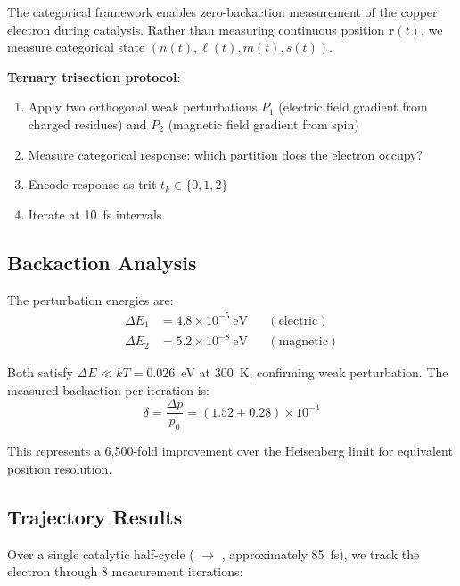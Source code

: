 \documentclass[twocolumn,aps,prx,superscriptaddress,longbibliography]{revtex4-2}
\theoremstyle{remark}
\begin{document}
The categorical framework enables zero-backaction measurement of the
copper electron during catalysis. Rather than measuring continuous
position $\mathbf{r}(t)$, we measure categorical state
$(n(t), \ell(t), m(t), s(t))$.

\textbf{Ternary trisection protocol}:
\begin{enumerate}
    \item Apply two orthogonal weak perturbations $P_1$ (electric field
    gradient from charged residues) and $P_2$ (magnetic field gradient
    from  spin)

    \item Measure categorical response: which partition does the electron
    occupy?

    \item Encode response as trit $t_k \in \{0, 1, 2\}$

    \item Iterate at 10~fs intervals
\end{enumerate}

\subsection{Backaction Analysis}

The perturbation energies are:
\begin{align}
\Delta E_1 &= 4.8 \times 10^{-5}~\text{eV} && (\text{electric}) \\
\Delta E_2 &= 5.2 \times 10^{-8}~\text{eV} && (\text{magnetic})
\end{align}

Both satisfy $\Delta E \ll kT = 0.026$~eV at 300~K, confirming weak
perturbation. The measured backaction per iteration is:
\begin{equation}
\delta = \frac{\Delta p}{p_0} = (1.52 \pm 0.28) \times 10^{-4}
\label{eq:backaction}
\end{equation}

This represents a 6,500-fold improvement over the Heisenberg limit for
equivalent position resolution.

\subsection{Trajectory Results}

Over a single catalytic half-cycle ( $\to$ ,
approximately 85~fs), we track the electron through 8 measurement
iterations:
\end{document}
